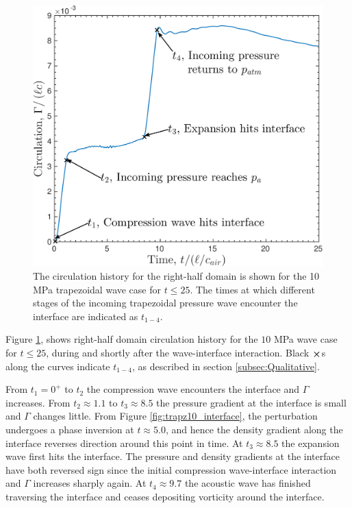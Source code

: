 \begin{figure}[h] 
  \centering
  \includegraphics[height=0.3\textheight]{./figs/lung_figs/trapz10_circ_schematic}
  \caption[Circulation deposition by the 10 MPa trapezoidal wave] {The
    circulation history for the right-half domain is shown for the 10
    MPa trapezoidal wave case for $t\leq25$. The times at which
    different stages of the incoming trapezoidal pressure wave
    encounter the interface are indicated as $t_{1-4}$.}
  \label{fig:trapz10_circ_schematic}
\end{figure}

Figure \ref{fig:trapz10_circ_schematic}, shows right-half domain
circulation history for the $10$ MPa wave case for $t\leq25$, during
and shortly after the wave-interface interaction. Black $\boldsymbol{\times}$s
along the curves indicate $t_{1-4}$, as described in
section \ref{subsec:Qualitative}.

From $t_1=0^+$ to $t_2$ the compression wave encounters the interface
and $\Gamma$ increases. From $t_2\approx1.1$ to $t_3\approx8.5$ the
pressure gradient at the interface is small and $\Gamma$ changes
little. From Figure \ref{fig:trapz10_interface}, the perturbation
undergoes a phase inversion at $t\approx 5.0$, and hence the density
gradient along the interface reverses direction around this point in
time. At $t_3\approx8.5$ the expansion wave first hits the
interface. The pressure and density gradients at the interface have
both reversed sign since the initial compression wave-interface
interaction and $\Gamma$ increases sharply again. At
$t_4\approx9.7$ the acoustic wave has finished traversing the
interface and ceases depositing vorticity around the interface.

